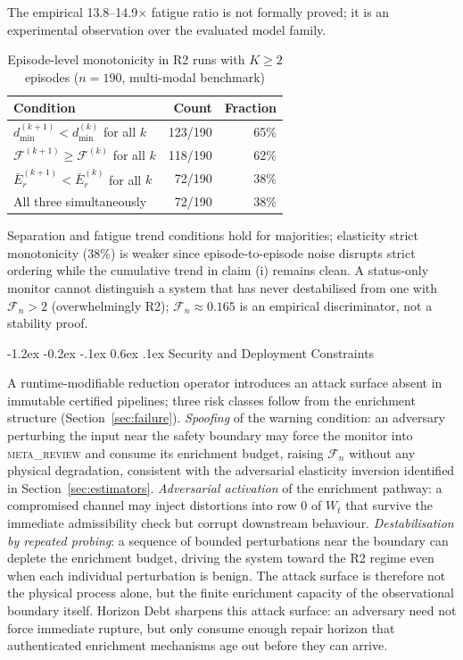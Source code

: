 \documentclass{llncs}
\makeatletter
\renewcommand\section{\@startsection{section}{1}{\z@}%
  {-1.2ex \@plus -0.2ex \@minus -.1ex}%
  {0.6ex \@plus .1ex}%
  {\normalfont\large\bfseries}}
\newcommand{\st}[1]{\textup{\textsc{#1}}}
\makeatother
\begin{document}
The empirical 13.8--14.9$\times$ fatigue ratio is not formally proved;
it is an experimental observation over the evaluated model family.

\begin{table}[H]
\centering
\caption{Episode-level monotonicity in R2 runs with $K \geq 2$ episodes
  ($n = 190$, multi-modal benchmark)}
\label{tab:mrp}
\begin{tabular}{lrr}
\toprule
\textbf{Condition} & \textbf{Count} & \textbf{Fraction} \\
\midrule
$d_{\min}^{(k+1)} < d_{\min}^{(k)}$ for all $k$           & 123/190 & 65\% \\
$\mathcal{F}^{(k+1)} \geq \mathcal{F}^{(k)}$ for all $k$  & 118/190 & 62\% \\
$\bar{E}_r^{(k+1)} < \bar{E}_r^{(k)}$ for all $k$         &  72/190 & 38\% \\
All three simultaneously                                    &  72/190 & 38\% \\
\bottomrule
\end{tabular}
\end{table}

Separation and fatigue trend conditions hold for majorities; elasticity
strict monotonicity (38\%) is weaker since episode-to-episode noise
disrupts strict ordering while the cumulative trend in claim (i)
remains clean. A status-only monitor cannot distinguish a system that
has never destabilised from one with $\mathcal{F}_n > 2$ (overwhelmingly
R2); $\mathcal{F}_n \approx 0.165$ is an empirical discriminator, not a
stability proof.

\section{Security and Deployment Constraints}
\label{sec:security}

A runtime-modifiable reduction operator introduces an attack surface
absent in immutable certified pipelines; three risk classes follow
from the enrichment structure (Section~\ref{sec:failure}).
\textit{Spoofing} of the warning condition: an adversary perturbing the
input near the safety boundary may force the monitor into
\st{meta\_review} and consume its enrichment budget, raising
$\mathcal{F}_n$ without any physical degradation, consistent with the
adversarial elasticity inversion identified in
Section~\ref{sec:estimators}.
\textit{Adversarial activation} of the enrichment pathway: a compromised
channel may inject distortions into row 0 of $W_t$ that survive the
immediate admissibility check but corrupt downstream behaviour.
\textit{Destabilisation by repeated probing}: a sequence of bounded
perturbations near the boundary can deplete the enrichment budget,
driving the system toward the R2 regime even when each individual
perturbation is benign. The attack surface is therefore not the physical process alone, but the
finite enrichment capacity of the observational boundary itself. Horizon Debt sharpens this attack surface: an adversary need not force immediate rupture, but only consume enough repair horizon that authenticated enrichment mechanisms age out before they can arrive.
\end{document}
